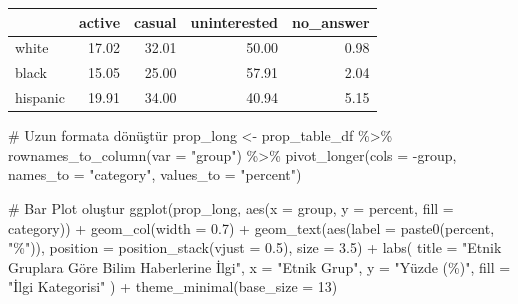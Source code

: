 \documentclass[
  letterpaper,
  DIV=11,
  numbers=noendperiod]{scrartcl}
\newenvironment{Shaded}{\begin{snugshade}}{\end{snugshade}}
\newcommand{\AttributeTok}[1]{\textcolor[rgb]{0.40,0.45,0.13}{#1}}
\newcommand{\CommentTok}[1]{\textcolor[rgb]{0.37,0.37,0.37}{#1}}
\newcommand{\DecValTok}[1]{\textcolor[rgb]{0.68,0.00,0.00}{#1}}
\newcommand{\FloatTok}[1]{\textcolor[rgb]{0.68,0.00,0.00}{#1}}
\newcommand{\FunctionTok}[1]{\textcolor[rgb]{0.28,0.35,0.67}{#1}}
\newcommand{\NormalTok}[1]{\textcolor[rgb]{0.00,0.23,0.31}{#1}}
\newcommand{\OtherTok}[1]{\textcolor[rgb]{0.00,0.23,0.31}{#1}}
\newcommand{\SpecialCharTok}[1]{\textcolor[rgb]{0.37,0.37,0.37}{#1}}
\newcommand{\StringTok}[1]{\textcolor[rgb]{0.13,0.47,0.30}{#1}}
\begin{document}
\begin{longtable}[]{@{}lrrrr@{}}
\toprule\noalign{}
& active & casual & uninterested & no\_answer \\
\midrule\noalign{}
\endhead
\bottomrule\noalign{}
\endlastfoot
white & 17.02 & 32.01 & 50.00 & 0.98 \\
black & 15.05 & 25.00 & 57.91 & 2.04 \\
hispanic & 19.91 & 34.00 & 40.94 & 5.15 \\
\end{longtable}

\begin{Shaded}
\begin{Highlighting}[]
\CommentTok{\# Uzun formata dönüştür}
\NormalTok{prop\_long }\OtherTok{\textless{}{-}}\NormalTok{ prop\_table\_df }\SpecialCharTok{\%\textgreater{}\%}
  \FunctionTok{rownames\_to\_column}\NormalTok{(}\AttributeTok{var =} \StringTok{"group"}\NormalTok{) }\SpecialCharTok{\%\textgreater{}\%}
  \FunctionTok{pivot\_longer}\NormalTok{(}\AttributeTok{cols =} \SpecialCharTok{{-}}\NormalTok{group, }\AttributeTok{names\_to =} \StringTok{"category"}\NormalTok{, }\AttributeTok{values\_to =} \StringTok{"percent"}\NormalTok{)}

\CommentTok{\# Bar Plot oluştur}
\FunctionTok{ggplot}\NormalTok{(prop\_long, }\FunctionTok{aes}\NormalTok{(}\AttributeTok{x =}\NormalTok{ group, }\AttributeTok{y =}\NormalTok{ percent, }\AttributeTok{fill =}\NormalTok{ category)) }\SpecialCharTok{+}
  \FunctionTok{geom\_col}\NormalTok{(}\AttributeTok{width =} \FloatTok{0.7}\NormalTok{) }\SpecialCharTok{+}
  \FunctionTok{geom\_text}\NormalTok{(}\FunctionTok{aes}\NormalTok{(}\AttributeTok{label =} \FunctionTok{paste0}\NormalTok{(percent, }\StringTok{"\%"}\NormalTok{)),}
            \AttributeTok{position =} \FunctionTok{position\_stack}\NormalTok{(}\AttributeTok{vjust =} \FloatTok{0.5}\NormalTok{),}
            \AttributeTok{size =} \FloatTok{3.5}\NormalTok{) }\SpecialCharTok{+}
  \FunctionTok{labs}\NormalTok{(}
    \AttributeTok{title =} \StringTok{"Etnik Gruplara Göre Bilim Haberlerine İlgi"}\NormalTok{,}
    \AttributeTok{x =} \StringTok{"Etnik Grup"}\NormalTok{,}
    \AttributeTok{y =} \StringTok{"Yüzde (\%)"}\NormalTok{,}
    \AttributeTok{fill =} \StringTok{"İlgi Kategorisi"}
\NormalTok{  ) }\SpecialCharTok{+}
  \FunctionTok{theme\_minimal}\NormalTok{(}\AttributeTok{base\_size =} \DecValTok{13}\NormalTok{)}
\end{Highlighting}
\end{Shaded}
\end{document}
